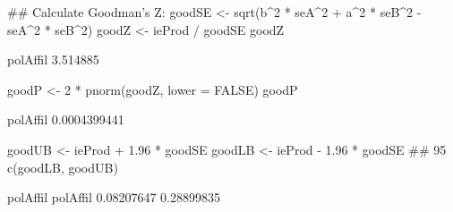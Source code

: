 \begin{Schunk}
\begin{Sinput}
 ## Calculate Goodman's Z:
 goodSE <- sqrt(b^2 * seA^2 + a^2 * seB^2 - seA^2 * seB^2)
 goodZ <- ieProd / goodSE
 goodZ
\end{Sinput}
\begin{Soutput}
polAffil 
3.514885 
\end{Soutput}
\begin{Sinput}
 goodP <- 2 * pnorm(goodZ, lower = FALSE)
 goodP
\end{Sinput}
\begin{Soutput}
    polAffil 
0.0004399441 
\end{Soutput}
\begin{Sinput}
 goodUB <- ieProd + 1.96 * goodSE
 goodLB <- ieProd - 1.96 * goodSE
 ## 95% Goodman CI:
 c(goodLB, goodUB)
\end{Sinput}
\begin{Soutput}
  polAffil   polAffil 
0.08207647 0.28899835 
\end{Soutput}
\end{Schunk}
